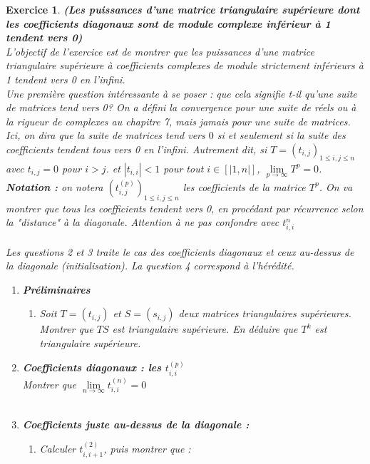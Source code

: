 \documentclass[a4paper,11pt]{article}
\newtheorem{exer}{Exercice} %
\begin{document}
\begin{exer}\textbf{(Les puissances d'une matrice triangulaire supérieure dont les coefficients diagonaux sont de module complexe inférieur à 1 tendent vers 0)}\\
\textit{L'objectif de l'exercice est de montrer que les puissances d'une matrice triangulaire supérieure à coefficients complexes de module strictement inférieurs à 1 tendent vers 0 en l'infini. \\
Une première question intéressante à se poser : que cela signifie t-il qu'une suite de matrices tend vers 0? On a défini la convergence pour une suite de réels ou à la rigueur de complexes au chapitre 7, mais jamais pour une suite de matrices. \\
Ici, on dira que la suite de matrices tend vers $0$ si et seulement si la suite des coefficients tendent tous vers 0 en l'infini.
}
 \newline
Autrement dit, si $T = (t_{i,j})_{1 \leq i,j \leq n}$ avec $t_{i,j} = 0$ pour $i>j$.
et $|t_{i,i}| < 1$ pour tout $i \in [|1,n|]$, $\lim\limits_{p \to \infty} T^p = 0$. \newline
\textbf{Notation :} on notera $(t_{i,j}^{(p)})_{1 \leq i,j \leq n}$ les coefficients de la matrice $T^p$. 
On va montrer que tous les coefficients tendent vers 0, en procédant par récurrence selon la "distance" à la diagonale. Attention à ne pas confondre avec $t_{i,i}^n$ \\ \\
Les questions 2 et 3 traite le cas des coefficients diagonaux et ceux au-dessus de la diagonale (initialisation). La question 4 correspond à l'hérédité.
\begin{enumerate}
\item \textbf{Préliminaires}
\begin{enumerate}
\item Soit $T=(t_{i,j})$ et $S=(s_{i,j})$ deux matrices triangulaires supérieures. Montrer que $TS$ est triangulaire supérieure. En déduire que $T^k$ est triangulaire supérieure.
\end{enumerate}
\item \textbf{Coefficients diagonaux : les $t_{i,i}^{(p)}$} \\
Montrer que $\lim\limits_{n \to \infty} t_{i,i}^{(n)}  = 0$ \\ \\
\item \textbf{Coefficients juste au-dessus de la diagonale :}
\begin{enumerate}
\item Calculer $t_{i,i+1}^{(2)}$, puis montrer que :

\end{enumerate}
\end{enumerate}
\end{exer}
\end{document}
